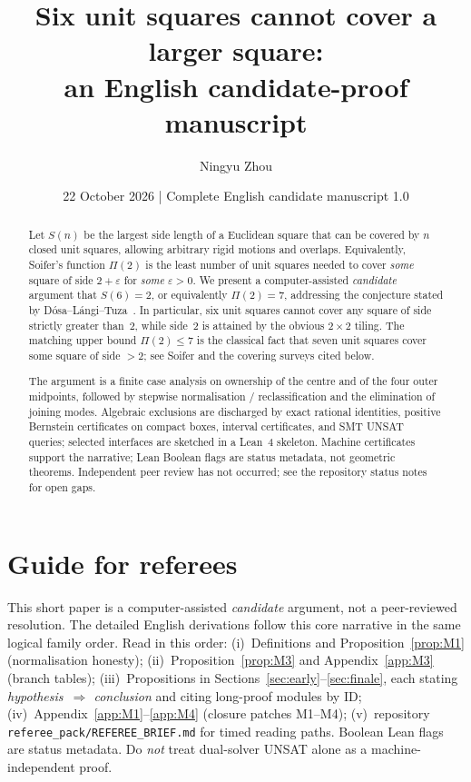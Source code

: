 \documentclass[11pt,reqno]{amsart}
\title[Six unit squares cannot cover a larger square]
{Six unit squares cannot cover a larger square:\\ an English candidate-proof manuscript}
\author{Ningyu Zhou}
\date{22 October 2026 | Complete English candidate manuscript 1.0}
\theoremstyle{definition}
\begin{document}
\begin{abstract}
Let $S(n)$ be the largest side length of a Euclidean square that can be covered
by $n$ closed unit squares, allowing arbitrary rigid motions and overlaps.
Equivalently, Soifer's function $\Pi(2)$ is the least number of unit squares
needed to cover \emph{some} square of side $2+\varepsilon$ for \emph{some}
$\varepsilon>0$.
We present a computer-assisted \emph{candidate} argument that $S(6)=2$, or
equivalently $\Pi(2)=7$, addressing the conjecture stated by
D\'osa--L\'angi--Tuza~\cite{DLT2026}.
In particular, six unit squares cannot cover any square of side strictly
greater than~$2$, while side~$2$ is attained by the obvious $2\times 2$ tiling.
The matching upper bound $\Pi(2)\le 7$ is the classical fact that seven unit
squares cover some square of side $>2$; see Soifer and the covering surveys
cited below.

The argument is a finite case analysis on ownership of the centre and of the
four outer midpoints, followed by stepwise normalisation / reclassification
and the elimination of joining modes.  Algebraic exclusions are discharged by
exact rational identities, positive Bernstein certificates on compact boxes,
interval certificates, and SMT UNSAT queries; selected interfaces are sketched
in a Lean~4 skeleton.  Machine certificates support the narrative; Lean Boolean
flags are status metadata, not geometric theorems.  Independent peer review has
not occurred; see the repository status notes for open gaps.
\end{abstract}


\maketitle

\tableofcontents

\section*{Guide for referees}
This short paper is a computer-assisted \emph{candidate} argument, not a
peer-reviewed resolution. The detailed English derivations follow this core
narrative in the same logical family order. Read in this order: (i)~Definitions and
Proposition~\ref{prop:M1} (normalisation honesty); (ii)~Proposition~\ref{prop:M3}
and Appendix~\ref{app:M3} (branch tables); (iii)~Propositions in
Sections~\ref{sec:early}--\ref{sec:finale}, each stating
\emph{hypothesis~$\Rightarrow$ conclusion} and citing long-proof modules by
ID; (iv)~Appendix~\ref{app:M1}--\ref{app:M4} (closure patches M1--M4);
(v)~repository \texttt{referee\_pack/REFEREE\_BRIEF.md} for timed reading
paths.  Boolean Lean flags are status metadata.  Do \emph{not} treat
dual-solver UNSAT alone as a machine-independent proof.
\end{document}
